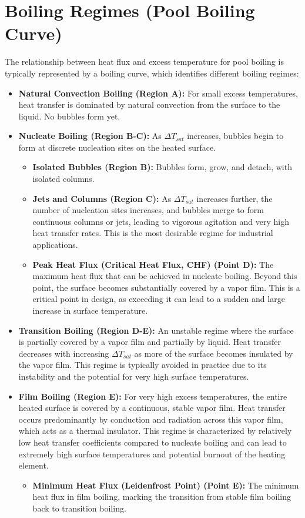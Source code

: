 \section{Boiling Regimes (Pool Boiling Curve)}
The relationship between heat flux and excess temperature for pool boiling is typically represented by a boiling curve, which identifies different boiling regimes:
\begin{itemize}
    \item \textbf{Natural Convection Boiling (Region A):} For small excess temperatures, heat transfer is dominated by natural convection from the surface to the liquid. No bubbles form yet.
    \item \textbf{Nucleate Boiling (Region B-C):} As $\Delta T_{sat}$ increases, bubbles begin to form at discrete nucleation sites on the heated surface.
        \begin{itemize}
            \item \textbf{Isolated Bubbles (Region B):} Bubbles form, grow, and detach, with isolated columns.
            \item \textbf{Jets and Columns (Region C):} As $\Delta T_{sat}$ increases further, the number of nucleation sites increases, and bubbles merge to form continuous columns or jets, leading to vigorous agitation and very high heat transfer rates. This is the most desirable regime for industrial applications.
        \item \textbf{Peak Heat Flux (Critical Heat Flux, CHF) (Point D):} The maximum heat flux that can be achieved in nucleate boiling. Beyond this point, the surface becomes substantially covered by a vapor film. This is a critical point in design, as exceeding it can lead to a sudden and large increase in surface temperature.
        \end{itemize}
    \item \textbf{Transition Boiling (Region D-E):} An unstable regime where the surface is partially covered by a vapor film and partially by liquid. Heat transfer decreases with increasing $\Delta T_{sat}$ as more of the surface becomes insulated by the vapor film. This regime is typically avoided in practice due to its instability and the potential for very high surface temperatures.
    \item \textbf{Film Boiling (Region E):} For very high excess temperatures, the entire heated surface is covered by a continuous, stable vapor film. Heat transfer occurs predominantly by conduction and radiation across this vapor film, which acts as a thermal insulator. This regime is characterized by relatively low heat transfer coefficients compared to nucleate boiling and can lead to extremely high surface temperatures and potential burnout of the heating element.
        \begin{itemize}
            \item \textbf{Minimum Heat Flux (Leidenfrost Point) (Point E):} The minimum heat flux in film boiling, marking the transition from stable film boiling back to transition boiling.
        \end{itemize}
\end{itemize}

